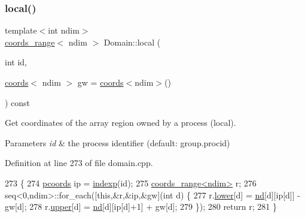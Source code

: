 \subsubsection{\texorpdfstring{local()}{local()}\hspace{0.1cm}{\footnotesize\ttfamily [1/2]}}
{\footnotesize\ttfamily template$<$int ndim$>$ \\
\hyperlink{structshark_1_1ndim_1_1coords__range}{coords\+\_\+range}$<$ ndim $>$ Domain\+::local (\begin{DoxyParamCaption}\item[{int}]{id,  }\item[{\hyperlink{structshark_1_1ndim_1_1coords}{coords}$<$ ndim $>$}]{gw = {\ttfamily \hyperlink{structshark_1_1ndim_1_1coords}{coords}$<$ndim$>$()} }\end{DoxyParamCaption}) const}

Get coordinates of the array region owned by a process (local). 
\begin{DoxyParams}{Parameters}
{\em id} & the process identifier (default\+: group.\+procid) \\
\hline
\end{DoxyParams}


Definition at line 273 of file domain.\+cpp.


\begin{DoxyCode}
273                                                                     \{
274     \hyperlink{classshark_1_1ndim_1_1_domain_a9684ccd8af33cff7639c782290ac37ee}{pcoords} ip = \hyperlink{classshark_1_1ndim_1_1_domain_ab8a7d1fa990b118f316f1e630e86b203}{indexp}(\textcolor{keywordtype}{id});
275     \hyperlink{structshark_1_1ndim_1_1coords__range}{coords\_range<ndim>} r;
276     seq<0,ndim>::for\_each([\textcolor{keyword}{this},&r,&ip,&gw](\textcolor{keywordtype}{int} d) \{
277         r.\hyperlink{structshark_1_1ndim_1_1coords__range_a46cae2c424d7b20f911a970c92581b19}{lower}[d] = \hyperlink{classshark_1_1ndim_1_1_domain_a4964336cc4ccdb2bfcc616fdcbb9a570}{nd}[d][ip[d]] - gw[d];
278         r.\hyperlink{structshark_1_1ndim_1_1coords__range_ae0101e4bb3ecadf1faa0fc786dfb05db}{upper}[d] = \hyperlink{classshark_1_1ndim_1_1_domain_a4964336cc4ccdb2bfcc616fdcbb9a570}{nd}[d][ip[d]+1] + gw[d];
279     \});
280     \textcolor{keywordflow}{return} r;
281 \}
\end{DoxyCode}
\hypertarget{classshark_1_1ndim_1_1_domain_acaf625c94a4f874d55f5989ece9dda9e}{}\label{classshark_1_1ndim_1_1_domain_acaf625c94a4f874d55f5989ece9dda9e} 
